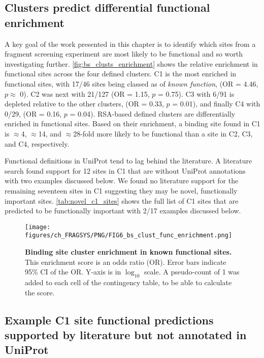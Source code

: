 \subsection{Clusters predict differential functional enrichment}

A key goal of the work presented in this chapter is to identify which sites from a fragment screening experiment are most likely to be functional and so worth investigating further. \autoref{fig:bs_clusts_enrichment} shows the relative enrichment in functional sites across the four defined clusters. C1 is the most enriched in functional sites, with 17/46 sites being classed as of \textit{known function}, (OR = 4.46, $p \approx$ 0). C2 was next with 21/127 (OR = 1.15, $p$ = 0.75). C3 with 6/91 is depleted relative to the other clusters, (OR = 0.33, $p$ = 0.01), and finally C4 with 0/29, (OR = 0.16, $p$ = 0.04). RSA-based defined clusters are differentially enriched in functional sites. Based on their enrichment, a binding site found in C1 is $\approx$4, $\approx$14, and $\approx$28-fold more likely to be functional than a site in C2, C3, and C4, respectively.

Functional definitions in UniProt tend to lag behind the literature. A literature search found support for 12 sites in C1 that are without UniProt annotations with two examples discussed below. We found no literature support for the remaining seventeen sites in C1 suggesting they may be novel, functionally important sites.  \autoref{tab:novel_c1_sites} shows the full list of C1 sites that are predicted to be functionally important with 2/17 examples discussed below.

\begin{figure}[htb!]
    \centering
    \texttt{[image: figures/ch\_FRAGSYS/PNG/FIG6\_bs\_clust\_func\_enrichment.png]}
    \caption[Binding site cluster enrichment in known functional sites]{\textbf{Binding site cluster enrichment in known functional sites.} This enrichment score is an odds ratio (OR). Error bars indicate 95\% CI of the OR. Y-axis is in $\log_{10}$ scale. A pseudo-count of 1 was added to each cell of the contingency table, to be able to calculate the score.}
    \label{fig:bs_clusts_enrichment}
\end{figure}

\subsection{Example C1 site functional predictions supported by literature but not annotated in UniProt}

